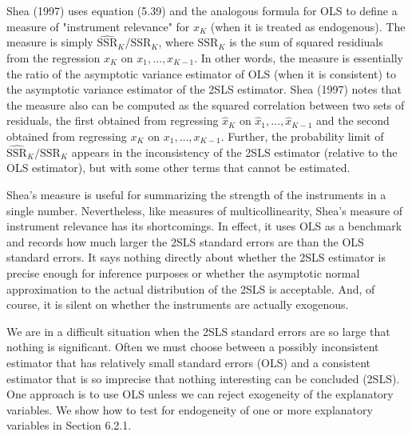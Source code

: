 \documentclass[10pt]{article}
\begin{document}
Shea (1997) uses equation (5.39) and the analogous formula for OLS to define a measure of "instrument relevance" for $x_{K}$ (when it is treated as endogenous). The measure is simply $\widehat{\mathrm{SSR}}_{K} / \mathrm{SSR}_{K}$, where $\mathrm{SSR}_{K}$ is the sum of squared residiuals from the regression $x_{K}$ on $x_{1}, \ldots, x_{K-1}$. In other words, the measure is essentially the ratio of the asymptotic variance estimator of OLS (when it is consistent) to the asymptotic variance estimator of the 2SLS estimator. Shea (1997) notes that the measure also can be computed as the squared correlation between two sets of residuals, the first obtained from regressing $\hat{x}_{K}$ on $\hat{x}_{1}, \ldots, \hat{x}_{K-1}$ and the second obtained from regressing $x_{K}$ on $x_{1}, \ldots, x_{K-1}$. Further, the probability limit of $\widehat{\mathrm{SSR}}_{K} / \mathrm{SSR}_{K}$ appears in the inconsistency of the 2SLS estimator (relative to the OLS estimator), but with some other terms that cannot be estimated.

Shea's measure is useful for summarizing the strength of the instruments in a single number. Nevertheless, like measures of multicollinearity, Shea's measure of instrument relevance has its shortcomings. In effect, it uses OLS as a benchmark and records how much larger the 2SLS standard errors are than the OLS standard errors. It says nothing directly about whether the 2SLS estimator is precise enough for inference purposes or whether the asymptotic normal approximation to the actual distribution of the 2SLS is acceptable. And, of course, it is silent on whether the instruments are actually exogenous.

We are in a difficult situation when the 2SLS standard errors are so large that nothing is significant. Often we must choose between a possibly inconsistent estimator that has relatively small standard errors (OLS) and a consistent estimator that is so imprecise that nothing interesting can be concluded (2SLS). One approach is to use OLS unless we can reject exogeneity of the explanatory variables. We show how to test for endogeneity of one or more explanatory variables in Section 6.2.1.
\end{document}
